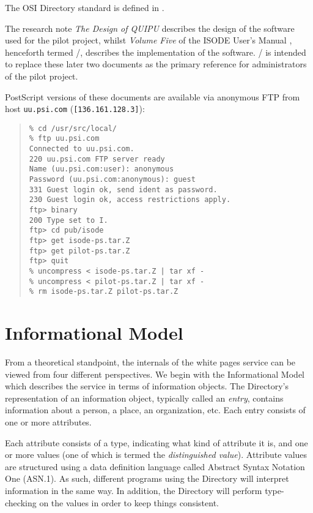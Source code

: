 The OSI Directory standard is defined in \cite{ISO.Directory,CCITT.Directory}.

The research note {\em The Design of QUIPU\/} \cite{QUIPU.Design}
describes the design of the software used for the pilot project,
whilst {\em Volume Five\/} of the ISODE User's Manual \cite{QUIPU.Manual},
henceforth termed \volfive/,
describes the implementation of the software.
\theguide/ is intended to replace these later two documents as the
primary reference for administrators of the pilot project.

PostScript versions of these documents are available via anonymous FTP
from host \verb"uu.psi.com" (\verb"[136.161.128.3]"):
\begin{quote}\small\begin{verbatim}
% cd /usr/src/local/
% ftp uu.psi.com
Connected to uu.psi.com.
220 uu.psi.com FTP server ready
Name (uu.psi.com:user): anonymous
Password (uu.psi.com:anonymous): guest
331 Guest login ok, send ident as password.
230 Guest login ok, access restrictions apply.
ftp> binary
200 Type set to I.
ftp> cd pub/isode
ftp> get isode-ps.tar.Z
ftp> get pilot-ps.tar.Z
ftp> quit
% uncompress < isode-ps.tar.Z | tar xf -
% uncompress < pilot-ps.tar.Z | tar xf -
% rm isode-ps.tar.Z pilot-ps.tar.Z
\end{verbatim}\end{quote}

\newpage
\section	{Informational Model}
From a theoretical standpoint,
the internals of the white pages service can be viewed from 
four different perspectives.
We begin with the Informational Model which describes the service in terms of
information objects.
The Directory's representation of an information object,
typically called an {\em entry},
contains information about a person, a place, an organization, etc.
Each entry consists of one or more attributes.

Each attribute consists of a type,
indicating what kind of attribute it is,
and one or more values
(one of which is termed the {\em distinguished value\/}).
Attribute values are structured using a data definition language
called  Abstract Syntax Notation One (ASN.1).
As such,
different programs using the Directory will interpret information in the same
way.
In addition,
the Directory will perform type-checking on the values in order
to keep things consistent.

